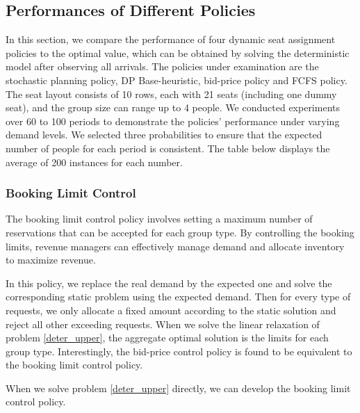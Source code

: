 \subsection{Performances of Different Policies}
In this section, we compare the performance of four dynamic seat assignment policies to the optimal value, which can be obtained by solving the deterministic model after observing all arrivals. The policies under examination are the stochastic planning policy, DP Base-heuristic, bid-price policy and FCFS policy. The seat layout consists of 10 rows, each with 21 seats (including one dummy seat), and the group size can range up to 4 people. We conducted experiments over 60 to 100 periods to demonstrate the policies' performance under varying demand levels. We selected three probabilities to ensure that the expected number of people for each period is consistent. The table below displays the average of 200 instances for each number.


\subsubsection{Booking Limit Control}
The booking limit control policy involves setting a maximum number of reservations that can be accepted for each group type. By controlling the booking limits, revenue managers can effectively manage demand and allocate inventory to maximize revenue.

In this policy, we replace the real demand by the expected one and solve the corresponding static problem using the expected demand. Then for every type of requests, we only allocate a fixed amount according to the static solution and reject all other exceeding requests. When we solve the linear relaxation of problem \eqref{deter_upper}, the aggregate optimal solution is the limits for each group type. Interestingly, the bid-price control policy is found to be equivalent to the booking limit control policy.

When we solve problem \eqref{deter_upper} directly, we can develop the booking limit control policy.

